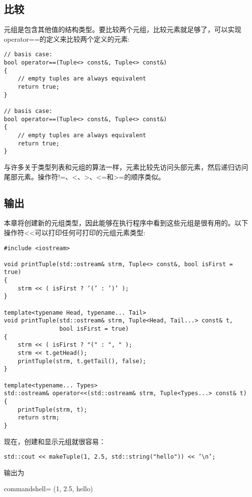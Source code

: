


\subsection{比较}

元组是包含其他值的结构类型。要比较两个元组，比较元素就足够了，可以实现operator==的定义来比较两个定义的元素:

\begin{lstlisting}[style=styleCXX]
// basis case:
bool operator==(Tuple<> const&, Tuple<> const&)
{
	// empty tuples are always equivalent
	return true;
}

// basis case:
bool operator==(Tuple<> const&, Tuple<> const&)
{
	// empty tuples are always equivalent
	return true;
}
\end{lstlisting}

与许多关于类型列表和元组的算法一样，元素比较先访问头部元素，然后递归访问尾部元素。操作符!=、<、>、<=和>=的顺序类似。

\subsection{输出}

本章将创建新的元组类型，因此能够在执行程序中看到这些元组是很有用的。以下操作符<{}<可以打印任何可打印的元组元素类型:

\begin{lstlisting}[style=styleCXX]
#include <iostream>

void printTuple(std::ostream& strm, Tuple<> const&, bool isFirst = true)
{
	strm << ( isFirst ? ’(’ : ’)’ );
}

template<typename Head, typename... Tail>
void printTuple(std::ostream& strm, Tuple<Head, Tail...> const& t,
				bool isFirst = true)
{
	strm << ( isFirst ? "(" : ", " );
	strm << t.getHead();
	printTuple(strm, t.getTail(), false);
}

template<typename... Types>
std::ostream& operator<<(std::ostream& strm, Tuple<Types...> const& t)
{
	printTuple(strm, t);
	return strm;
}
\end{lstlisting}

现在，创建和显示元组就很容易：

\begin{lstlisting}[style=styleCXX]
std::cout << makeTuple(1, 2.5, std::string("hello")) << ’\n’;
\end{lstlisting}

输出为

\begin{tcblisting}{commandshell={}}
(1, 2.5, hello)
\end{tcblisting}





















